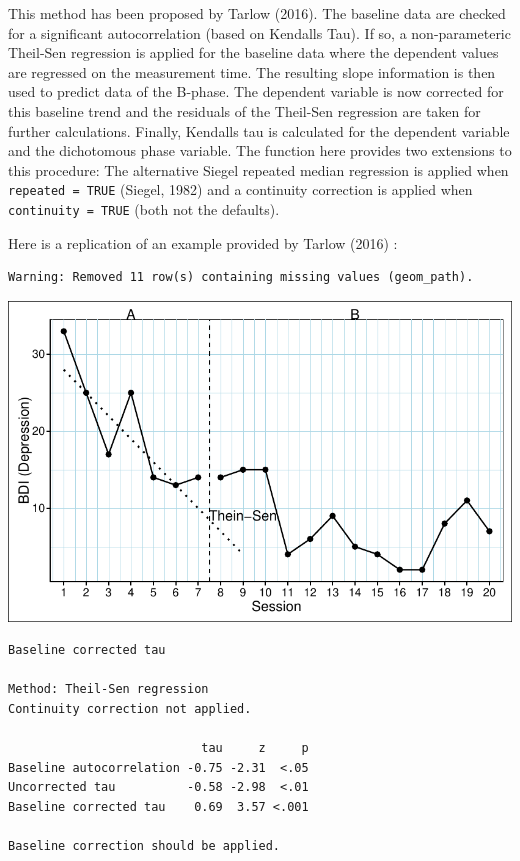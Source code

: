 \documentclass[
  letterpaper,
  DIV=11,
  numbers=noendperiod]{scrreprt}
\begin{document}
This method has been proposed by Tarlow (2016). The baseline data are
checked for a significant autocorrelation (based on Kendalls Tau). If
so, a non-parameteric Theil-Sen regression is applied for the baseline
data where the dependent values are regressed on the measurement time.
The resulting slope information is then used to predict data of the
B-phase. The dependent variable is now corrected for this baseline trend
and the residuals of the Theil-Sen regression are taken for further
calculations. Finally, Kendalls tau is calculated for the dependent
variable and the dichotomous phase variable. The function here provides
two extensions to this procedure: The alternative Siegel repeated median
regression is applied when \texttt{repeated\ =\ TRUE} (Siegel, 1982) and
a continuity correction is applied when \texttt{continuity\ =\ TRUE}
(both not the defaults).

Here is a replication of an example provided by Tarlow (2016) :

\begin{verbatim}
Warning: Removed 11 row(s) containing missing values (geom_path).
\end{verbatim}

\includegraphics{./ch_overlapping_indices_files/figure-pdf/bctau-example-1.pdf}

\begin{verbatim}
Baseline corrected tau

Method: Theil-Sen regression
Continuity correction not applied.

                           tau     z     p
Baseline autocorrelation -0.75 -2.31  <.05
Uncorrected tau          -0.58 -2.98  <.01
Baseline corrected tau    0.69  3.57 <.001

Baseline correction should be applied.
\end{verbatim}
\end{document}
